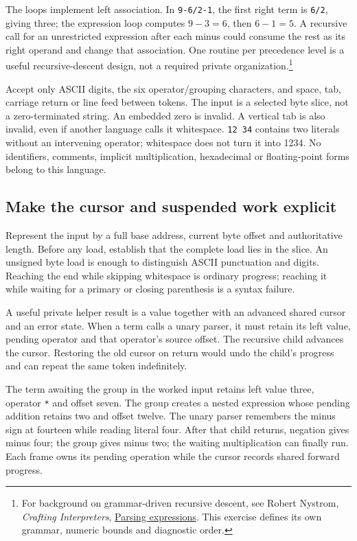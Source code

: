 The loops implement left association. In \texttt{9-6/2-1}, the first right term
is \texttt{6/2}, giving three; the expression loop computes \(9-3=6\), then
\(6-1=5\). A recursive call for an unrestricted expression after each minus
could consume the rest as its right operand and change that association.
One routine per precedence level is a useful recursive-descent design, not a
required private organization.\footnote{For background on grammar-driven
  recursive descent, see Robert Nystrom, \emph{Crafting Interpreters},
  \href{https://craftinginterpreters.com/parsing-expressions.html}{Parsing expressions}.
  This exercise defines its own grammar, numeric bounds and diagnostic order.}

Accept only ASCII digits, the six operator/grouping characters, and space,
tab, carriage return or line feed between tokens. The input is a selected byte
slice, not a zero-terminated string. An embedded zero is invalid. A vertical tab
is also invalid, even if another language calls it whitespace. \texttt{12 34}
contains two literals without an intervening operator; whitespace does not
turn it into 1234. No identifiers, comments, implicit multiplication, hexadecimal
or floating-point forms belong to this language.

\subsection*{Make the cursor and suspended work explicit}

Represent the input by a full base address, current byte offset and authoritative
length. Before any load, establish that the complete load lies in the slice.
An unsigned byte load is enough to distinguish ASCII punctuation and digits.
Reaching the end while skipping whitespace is ordinary progress; reaching it
while waiting for a primary or closing parenthesis is a syntax failure.

A useful private helper result is a value together with an advanced shared
cursor and an error state. When a term calls a unary parser, it must retain its
left value, pending operator and that operator's source offset. The recursive
child advances the cursor. Restoring the old cursor on return would undo the
child's progress and can repeat the same token indefinitely.



The term awaiting the group in the worked input retains left value three,
operator \texttt{*} and offset seven. The group creates a nested expression
whose pending addition retains two and offset twelve. The unary parser remembers
the minus sign at fourteen while reading literal four. After that child
returns, negation gives minus four; the group gives minus two; the waiting
multiplication can finally run. Each frame owns its pending operation while
the cursor records shared forward progress.

